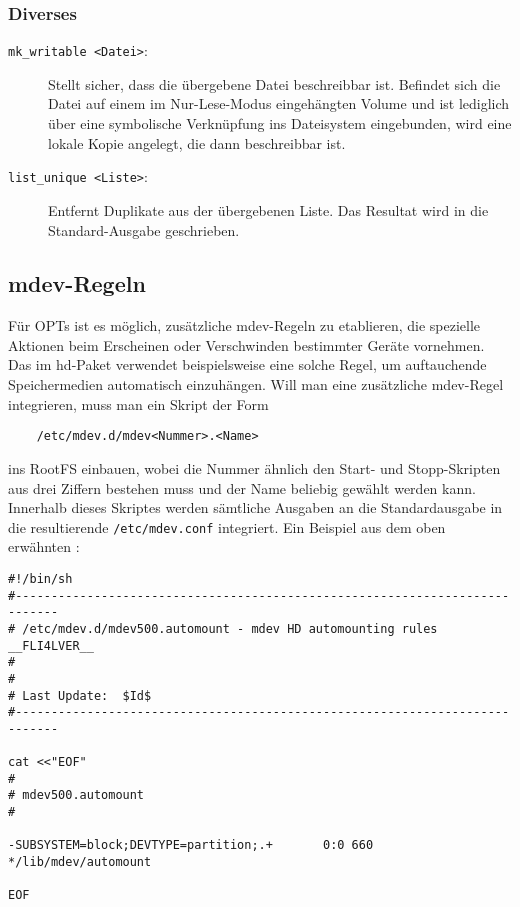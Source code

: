 \subsubsection{Diverses}

\begin{description}

\item[\texttt{mk\_writable <Datei>}:]
Stellt sicher, dass die übergebene Datei beschreibbar ist. Befindet sich die
Datei auf einem im Nur-Lese-Modus eingehängten Volume und ist lediglich über
eine symbolische Verknüpfung ins Dateisystem eingebunden, wird eine lokale Kopie
angelegt, die dann beschreibbar ist.

\item[\texttt{list\_unique <Liste>}:]
Entfernt Duplikate aus der übergebenen Liste. Das Resultat wird in die
Standard-Ausgabe geschrieben.

\end{description}

\subsection{mdev-Regeln}

Für OPTs ist es möglich, zusätzliche mdev-Regeln zu etablieren, die spezielle
Aktionen beim Erscheinen oder Verschwinden bestimmter Geräte vornehmen. Das
 im hd-Paket verwendet beispielsweise eine solche Regel,
um auftauchende Speichermedien automatisch einzuhängen. Will man eine
zusätzliche mdev-Regel integrieren, muss man ein Skript der Form

\begin{verbatim}
    /etc/mdev.d/mdev<Nummer>.<Name>
\end{verbatim}

ins RootFS einbauen, wobei die Nummer ähnlich den Start- und Stopp-Skripten aus
drei Ziffern bestehen muss und der Name beliebig gewählt werden kann. Innerhalb
dieses Skriptes werden sämtliche Ausgaben an die Standardausgabe in die
resultierende \texttt{/etc/mdev.conf} integriert. Ein Beispiel aus dem oben
erwähnten :

\begin{small}
\begin{verbatim}
#!/bin/sh
#----------------------------------------------------------------------------
# /etc/mdev.d/mdev500.automount - mdev HD automounting rules     __FLI4LVER__
#
#
# Last Update:  $Id$
#----------------------------------------------------------------------------

cat <<"EOF"
#
# mdev500.automount
#

-SUBSYSTEM=block;DEVTYPE=partition;.+       0:0 660 */lib/mdev/automount

EOF
\end{verbatim}
\end{small}

